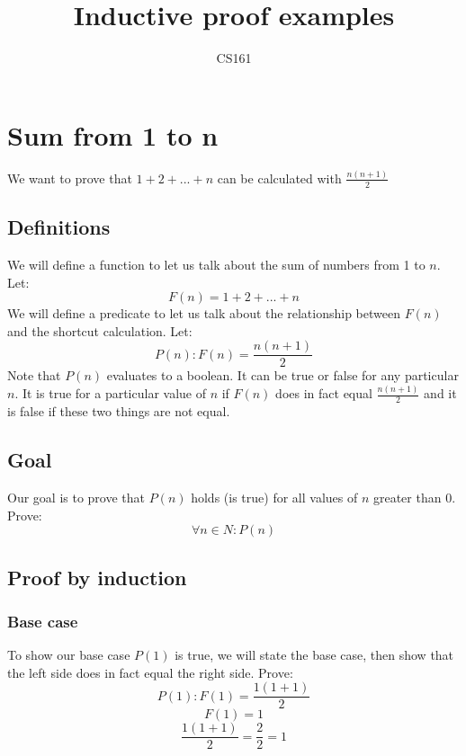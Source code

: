 \documentclass{article}
\title{Inductive proof examples}
\author{CS161}
\begin{document}
\maketitle

\section{Sum from 1 to n}
We want to prove that \(1 + 2 + ... + n \) can be calculated with \( \frac{n(n+1)}{2} \)
\subsection{Definitions}
We will define a function to let us talk about the sum of numbers from 1 to $n$. Let:
\begin{equation}
F(n) = 1 + 2 + ... + n
\end{equation}
We will define a predicate to let us talk about the relationship between $F(n)$ and the shortcut calculation. Let:
\begin{equation}
P(n): F(n) = \frac{n(n + 1)}{2}
\end{equation}
Note that $P(n)$ evaluates to a boolean. It can be true or false for any particular $n$. It is true for a particular value of $n$ if $F(n)$ does in fact equal \( \frac{n(n + 1)}{2} \) and it is false if these two things are not equal.

\subsection{Goal}
Our goal is to prove that $P(n)$ holds (is true) for all values of $n$ greater than 0. Prove:
\begin{equation}
\forall n \in N : P(n)
\end{equation}

\subsection{Proof by induction}
\subsubsection{Base case}
To show our base case $P(1)$ is true, we will state the base case, then show that the left side does in fact equal the right side. Prove:
\begin{equation}
P(1): F(1) = \frac{1(1 + 1)}{2}
\end{equation}
\[ F(1) = 1 \]
\[ \frac{1(1 + 1)}{2} = \frac{2}{2} = 1 \]
\end{document}
